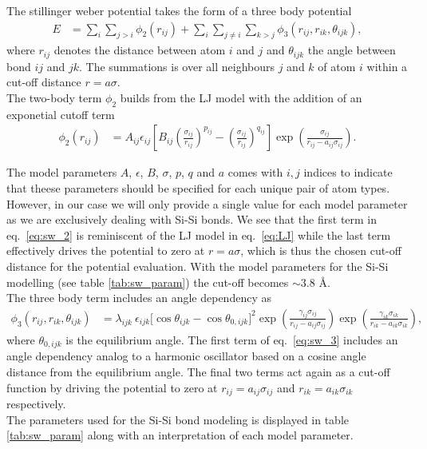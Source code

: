 The stillinger weber potential takes the form of a three body potential
\begin{align*}
  E &=\sum_i \sum_{j>i} \phi_2(r_{i j})+\sum_i \sum_{j \neq i} \sum_{k>j} \phi_3(r_{ij}, r_{ik}, \theta_{ijk}),
\end{align*}
where $r_{ij}$ denotes the distance between atom $i$ and $j$ and $\theta_{ijk}$
the angle between bond $ij$ and $jk$. The summations is over all neighbours $j$
and $k$ of atom $i$ within a cut-off distance $r = a\sigma$. \\
The two-body term $\phi_2$ builds from the LJ model with the addition of an
exponetial cutoff term
\begin{align}
  \phi_2(r_{i j}) & =A_{ij} \epsilon_{ij}\left[B_{ij}\left(\frac{\sigma_{ij}}{r_{ij}}\right)^{p_{ij}} - \left(\frac{\sigma_{ij}}{r_{ij}}\right)^{q_{ij}}\right] \exp (\frac{\sigma_{ij}}{r_{ij}-a_{ij} \sigma_{ij}}).
  \label{eq:sw_2}
\end{align}

The model parameters $A$, $\epsilon$, $B$, $\sigma$, $p$, $q$ and $a$ comes with
$i,j$ indices to indicate that theese parameters should be specified for each
unique pair of atom types. However, in our case we will only provide a single
value for each model parameter as we are exclusively dealing with Si-Si bonds.
We see that the first term in eq.~\eqref{eq:sw_2} is reminiscent of the LJ model
in eq.~\eqref{eq:LJ} while the last term effectively drives the potential to
zero at $r=a\sigma$, which is thus the chosen cut-off distance for the potential
evaluation. With the model parameters for the Si-Si modelling (see table
\ref{tab:sw_param}) the cut-off becomes $\sim 3.8$ Å. \\
The three body term includes an angle dependency as
\begin{align}
  \phi_3(r_{ij}, r_{ik}, \theta_{ijk}) &= \lambda_{ijk} \ \epsilon_{ijk} \Big[\cos \theta_{ijk}-\cos \theta_{0,ijk}\Big]^2 \exp (\frac{\gamma_{ij} \sigma_{ij}}{r_{ij} - a_{ij} \sigma_{ij}}) \exp (\frac{\gamma_{ik} \sigma_{ik}}{r_{ik} - a_{ik} \sigma_{ik}}),
  \label{eq:sw_3}
\end{align}
where $\theta_{0,ijk}$ is the equilibrium angle. The first term of
eq.~\eqref{eq:sw_3} includes an angle dependency analog to a harmonic oscillator
based on a cosine angle distance from the equilibrium angle. The final two terms
act again as a cut-off function by driving the potential to zero at $r_{ij} =
a_{ij}\sigma_{ij}$ and $r_{ik} = a_{ik}\sigma_{ik}$ respectively. \\ 
The parameters used for the Si-Si bond modeling is displayed in table
\ref{tab:sw_param} along with an interpretation of each model parameter.



